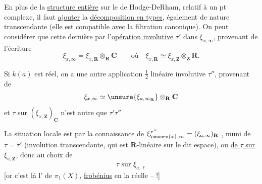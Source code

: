 En plus de la \uline{structure entière} sur le   de Hodge-DeRham, relatif à un pt complexe, il faut \uline{ajouter} la \uline{décomposition en types}, également de nature transcendante (elle est compatible avec la filtration canonique). On peut considérer que cette dernière   par l'\uline{opération involutive} $\tau'$  dans $\xi_{x,\infty}$, provenant de l'écriture
\[
\xi_{x,\infty}=\xi_{x,\mathbf R}\otimes_{\mathbf R}\mathbf C
\qquad\text{où}\quad\xi_{x,\mathbf R}\simeq\xi_{x,\mathbf Z}\otimes_{\mathbf Z}\mathbf R.
\]

Si $k(a)$ est réel, on a une autre application $\frac12$ linéaire involutive $\tau''$, provenant de
\[
\xi_{x,\infty}\simeq\unsure{\xi_{a,\infty_{\mathbf R}}}\otimes_{\mathbf R}\mathbf C
\]
et $\tau$ sur $(\xi_{x,\mathbf Z})_{\mathbf C}$ n'est autre que $\tau'\tau''$

La situation locale  est  par la connaissance de $\xi_{\unsure{x},\infty}^{\tau''}=(\xi_{a,\infty})_{\mathbf R}$ , muni de $\tau=\tau'$ (involution transcendante, qui est $\mathbf R$-linéaire sur le dit espace), ou  \uline{ de $\tau$ sur $\xi_{a,\mathbf Z}$}, donc au choix de
\[
\boxed{\tau\text{ sur }\xi_{a,\ell}}
\]
[or c'est là  l' de $\pi_1(X)$, \uline{frobénius} en la  réelle -- !]

